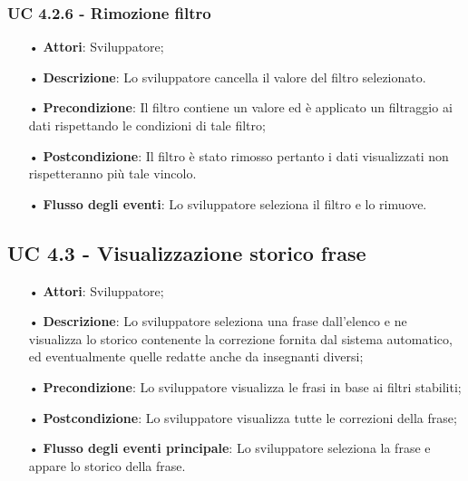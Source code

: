 \subsubsection{UC 4.2.6 - Rimozione filtro}
\begin{itemize}
\item[•]\textbf{Attori}: Sviluppatore;
\item[•]\textbf{Descrizione}: Lo sviluppatore cancella il valore del filtro selezionato.
\item[•]\textbf{Precondizione}: Il filtro contiene un valore ed è applicato un filtraggio ai dati rispettando le condizioni di tale filtro;
\item[•]\textbf{Postcondizione}: Il filtro è stato rimosso pertanto i dati visualizzati non rispetteranno più tale vincolo.
\item[•]\textbf{Flusso degli eventi}: Lo sviluppatore seleziona il filtro e lo rimuove.
 \end{itemize}
  
\subsection{UC 4.3 - Visualizzazione storico frase}
\begin{itemize}
\item[•]\textbf{Attori}: Sviluppatore;
\item[•]\textbf{Descrizione}: Lo sviluppatore seleziona una frase dall'elenco e ne visualizza lo storico contenente la correzione fornita dal sistema automatico, ed eventualmente quelle redatte anche da insegnanti diversi;
\item[•]\textbf{Precondizione}:  Lo sviluppatore visualizza le frasi in base ai filtri stabiliti;
\item[•]\textbf{Postcondizione}: Lo sviluppatore visualizza tutte le correzioni della frase;
\item[•]\textbf{Flusso degli eventi principale}: Lo sviluppatore seleziona la frase e appare lo storico della frase.
\end{itemize}

